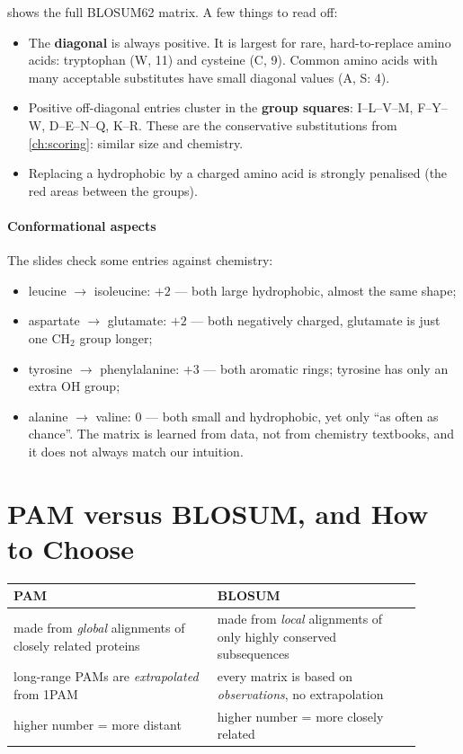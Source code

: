 \documentclass[11pt, oneside]{book}
\let\originalsection\section
\renewcommand{\section}{\Needspace{7\baselineskip}\originalsection}
\begin{document}
 shows the full BLOSUM62 matrix. A few things to read off:
\begin{itemize}
  \item The \textbf{diagonal} is always positive. It is largest for rare,
    hard-to-replace amino acids: tryptophan (W, 11) and cysteine (C, 9).
    Common amino acids with many acceptable substitutes have small diagonal
    values (A, S: 4).
  \item Positive off-diagonal entries cluster in the \textbf{group squares}:
    I--L--V--M, F--Y--W, D--E--N--Q, K--R. These are the conservative
    substitutions from \cref{ch:scoring}: similar size and chemistry.
  \item Replacing a hydrophobic by a charged amino acid is strongly penalised
    (the red areas between the groups).
\end{itemize}

\paragraph{Conformational aspects}
The slides check some entries against chemistry:
\begin{itemize}
  \item leucine $\to$ isoleucine: $+2$ --- both large hydrophobic, almost the
    same shape;
  \item aspartate $\to$ glutamate: $+2$ --- both negatively charged, glutamate
    is just one $\mathrm{CH_2}$ group longer;
  \item tyrosine $\to$ phenylalanine: $+3$ --- both aromatic rings; tyrosine has
    only an extra $\mathrm{OH}$ group;
  \item alanine $\to$ valine: $0$ --- both small and hydrophobic, yet only ``as
    often as chance''. The matrix is learned from data, not from chemistry
    textbooks, and it does not always match our intuition.
\end{itemize}

\section{PAM versus BLOSUM, and How to Choose}
\label{sec:choose-matrix}

\begin{center}
\small
\begin{tabular}{@{}p{0.45\linewidth}p{0.45\linewidth}@{}}
\toprule
\textbf{PAM} & \textbf{BLOSUM} \\
\midrule
made from \emph{global} alignments of closely related proteins &
made from \emph{local} alignments of only highly conserved subsequences \\
long-range PAMs are \emph{extrapolated} from 1PAM &
every matrix is based on \emph{observations}, no extrapolation \\
higher number = more distant &
higher number = more closely related \\
\bottomrule
\end{tabular}
\end{center}
\end{document}
